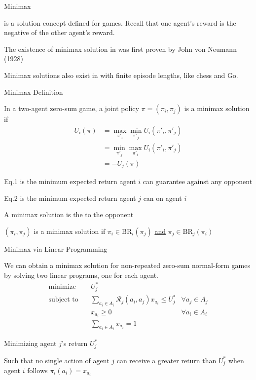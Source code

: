 \begin{frame}{Minimax}

     is a solution concept defined for  games. Recall that one agent's reward is the negative of the other agent's reward.
    \blist
        \item The existence of minimax solution in  was first proven by John von Neumann (1928)
        \item Minimax solutions also exist in  with finite episode lengths, like chess and Go. 
    \elist
    
\end{frame}

\begin{frame}[t]{Minimax Definition}

    In a two-agent zero-sum game, a joint policy \(\pi = (\pi_i, \pi_j)\) is a minimax solution if
    \vspace{2pt}
    \begin{align}
        U_i(\pi) &= \max_{\pi'_i} \min_{\pi'_j} U_i(\pi'_i, \pi'_j) \\
        &= \min_{\pi'_j} \max_{\pi'_i} U_i(\pi'_i, \pi'_j) \\
        &= -U_j(\pi)
    \end{align}

    \blist
        \item Eq.1 is the minimum expected return agent \(i\) can guarantee against any opponent
        \item Eq.2 is the minimum expected return agent \(j\) can  on agent \(i\)
        \item A minimax solution is the  to the  opponent
        \item \((\pi_i, \pi_j)\) is a minimax solution if \(\pi_i \in \text{BR}_i(\pi_j)\) \underline{and} \(\pi_j \in \text{BR}_j(\pi_i)\)
    \elist
      
\end{frame}

\begin{frame}{Minimax via Linear Programming}

We can obtain a minimax solution for non-repeated zero-sum normal-form games by solving two linear programs, one for each agent.
    \vspace{0pt}
    \begin{align*}
    \text{minimize} \quad & U^*_j \\
    \text{subject to} \quad & \sum_{a_i \in A_i} \mathcal{R}_j(a_i, a_j) x_{a_i} \leq U^*_j & \forall a_j \in A_j \\
    & x_{a_i} \geq 0 & \forall a_i \in A_i \\
    & \sum_{a_i \in A_i} x_{a_i} = 1
    \end{align*}

    \blist
        \item Minimizing agent \(j\)'s return \(U^*_j\)
        \item Such that no single action of agent \(j\) can receive a greater return than \(U^*_j\) when agent \(i\) follows \(\pi_i(a_i) = x_{a_i}\)
    \elist
\end{frame}


